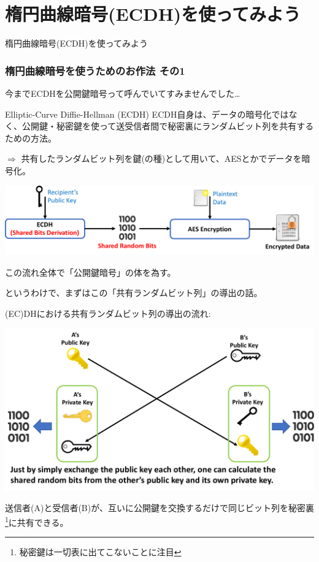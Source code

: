 \documentclass[12pt,dvipdfmx]{beamer}
\begin{document}
\section{楕円曲線暗号(ECDH)を使ってみよう}
\begin{frame}
\centering
{\Large 楕円曲線暗号(ECDH)を使ってみよう}
\end{frame}

\begin{frame}
\frametitle{楕円曲線暗号を使うためのお作法 その1}

今までECDHを公開鍵暗号って呼んでいてすみませんでした…

\begin{block}{\small Elliptic-Curve Diffie-Hellman (ECDH)}
ECDH自身は、データの暗号化ではなく、公開鍵・秘密鍵を使って\alert{送受信者間で秘密裏にランダムビット列を共有するための方法}。
\end{block}

$\Rightarrow$ 共有したランダムビット列を鍵(の種)として用いて、AESとかでデータを暗号化。

\begin{center}
\includegraphics[width=\linewidth]{Figs/ecdh-flow01.pdf}

この流れ全体で「公開鍵暗号」の体を為す。
\end{center}

というわけで、まずはこの「共有ランダムビット列」の導出の話。
\end{frame}


\begin{frame}
(EC)DHにおける共有ランダムビット列の導出の流れ:
\begin{center}
 \includegraphics[width=\linewidth]{Figs/ecdh-flow02.pdf}
\end{center}
\vspace{-1ex}
送信者(A)と受信者(B)が、\alert{互いに公開鍵を交換するだけで同じビット列を秘密裏\footnote[frame]{\scriptsize 秘密鍵は一切表に出てこないことに注目}に共有}できる。
\end{frame}
\end{document}
